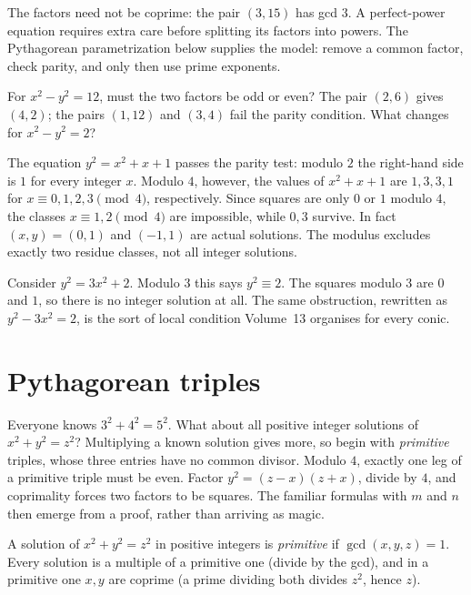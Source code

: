 The factors need not be coprime: the pair $(3,15)$ has gcd $3$.
A perfect-power equation requires extra care before splitting its factors
into powers. The Pythagorean parametrization below supplies the model:
remove a common factor, check parity, and only then use prime exponents.

\begin{think}
For $x^2-y^2=12$, must the two factors be odd or even?
The pair $(2,6)$ gives $(4,2)$; the pairs $(1,12)$ and $(3,4)$ fail the
parity condition. What changes for $x^2-y^2=2$?
\end{think}

\begin{examplex}
The equation $y^2=x^2+x+1$ passes the parity test: modulo $2$ the right-hand side is $1$ for every integer $x$. Modulo $4$, however, the values of $x^2+x+1$ are $1,3,3,1$ for $x\equiv0,1,2,3\pmod4$, respectively. Since squares are only $0$ or $1$ modulo $4$, the classes $x\equiv1,2\pmod4$ are impossible, while $0,3$ survive. In fact $(x,y)=(0,1)$ and $(-1,1)$ are actual solutions. The modulus excludes exactly two residue classes, not all integer solutions.
\end{examplex}

\begin{examplex}
Consider $y^2=3x^2+2$. Modulo $3$ this says $y^2\equiv 2$. The squares modulo $3$ are $0$ and $1$, so there is no integer solution at all. The same obstruction, rewritten as $y^2-3x^2=2$, is the sort of local condition Volume~13 organises for every conic.
\end{examplex}

\section{Pythagorean triples}

Everyone knows $3^2+4^2=5^2$. What about all positive integer solutions of $x^2+y^2=z^2$? Multiplying a known solution gives more, so begin with \emph{primitive} triples, whose three entries have no common divisor. Modulo $4$, exactly one leg of a primitive triple must be even. Factor $y^2=(z-x)(z+x)$, divide by $4$, and coprimality forces two factors to be squares. The familiar formulas with $m$ and $n$ then emerge from a proof, rather than arriving as magic.

A solution of $x^2+y^2=z^2$ in positive integers is \emph{primitive} if $\gcd(x,y,z)=1$. Every solution is a multiple of a primitive one (divide by the gcd), and in a primitive one $x,y$ are coprime (a prime dividing both divides $z^2$, hence $z$).

